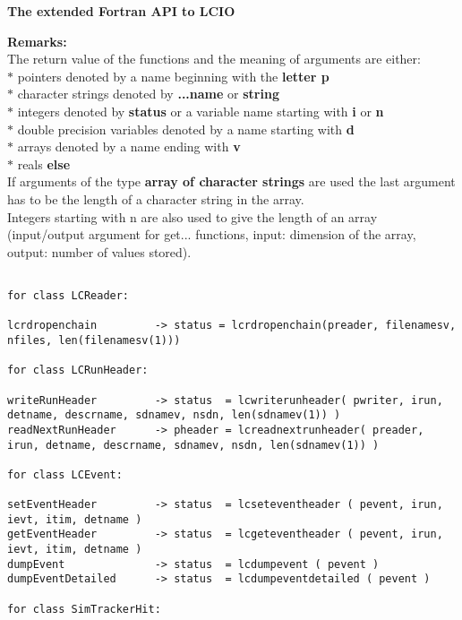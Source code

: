 \newpage
{\large\bf The extended Fortran API to LCIO} \\

\begin{scriptsize}

{\bf Remarks:} \\

The return value of the functions and the meaning of arguments are either: \\
$*$ pointers denoted by a name beginning with the {\bf letter p} \\
$*$ character strings denoted by {\bf ...name} or {\bf string} \\
$*$ integers  denoted by {\bf status} or a variable name starting with {\bf i} or {\bf n} \\
$*$ double precision variables denoted by a name starting with {\bf d} \\
$*$ arrays denoted by a name ending with {\bf v} \\
$*$ reals {\bf else} \\
If arguments of the type {\bf array of character strings} are used the last
argument has to be the length of a character string in the array.   \\
Integers starting with n are also used to give the length of an array 
(input/output argument for get... functions, input: dimension of the array, output: number of values stored).


\begin{verbatim}

for class LCReader:

lcrdropenchain         -> status = lcrdropenchain(preader, filenamesv, nfiles, len(filenamesv(1)))

for class LCRunHeader:

writeRunHeader         -> status  = lcwriterunheader( pwriter, irun, detname, descrname, sdnamev, nsdn, len(sdnamev(1)) )
readNextRunHeader      -> pheader = lcreadnextrunheader( preader, irun, detname, descrname, sdnamev, nsdn, len(sdnamev(1)) )

for class LCEvent:

setEventHeader         -> status  = lcseteventheader ( pevent, irun, ievt, itim, detname )
getEventHeader         -> status  = lcgeteventheader ( pevent, irun, ievt, itim, detname )
dumpEvent              -> status  = lcdumpevent ( pevent )
dumpEventDetailed      -> status  = lcdumpeventdetailed ( pevent )

for class SimTrackerHit:


\end{verbatim}
\end{scriptsize}
